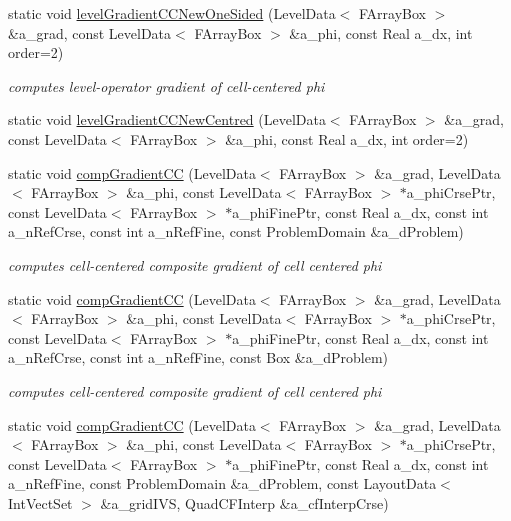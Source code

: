\begin{DoxyCompactItemize}
static void \hyperlink{class_gradient_a00daa2aa0e66c5f70545cbd9cdf633a2}{level\-Gradient\-C\-C\-New\-One\-Sided} (Level\-Data$<$ F\-Array\-Box $>$ \&a\-\_\-grad, const Level\-Data$<$ F\-Array\-Box $>$ \&a\-\_\-phi, const Real a\-\_\-dx, int order=2)
\begin{DoxyCompactList}\small\item\em computes level-\/operator gradient of cell-\/centered phi \end{DoxyCompactList}\item 
static void \hyperlink{class_gradient_a306b5f347d51c38d5cf8a7f446ea0b86}{level\-Gradient\-C\-C\-New\-Centred} (Level\-Data$<$ F\-Array\-Box $>$ \&a\-\_\-grad, const Level\-Data$<$ F\-Array\-Box $>$ \&a\-\_\-phi, const Real a\-\_\-dx, int order=2)
\item 
static void \hyperlink{class_gradient_a6c741fa4909be6c7d55ddc70a128ca93}{comp\-Gradient\-C\-C} (Level\-Data$<$ F\-Array\-Box $>$ \&a\-\_\-grad, Level\-Data$<$ F\-Array\-Box $>$ \&a\-\_\-phi, const Level\-Data$<$ F\-Array\-Box $>$ $\ast$a\-\_\-phi\-Crse\-Ptr, const Level\-Data$<$ F\-Array\-Box $>$ $\ast$a\-\_\-phi\-Fine\-Ptr, const Real a\-\_\-dx, const int a\-\_\-n\-Ref\-Crse, const int a\-\_\-n\-Ref\-Fine, const Problem\-Domain \&a\-\_\-d\-Problem)
\begin{DoxyCompactList}\small\item\em computes cell-\/centered composite gradient of cell centered phi \end{DoxyCompactList}\item 
static void \hyperlink{class_gradient_a0a941dcb9ad58ed819f41d4fe1080106}{comp\-Gradient\-C\-C} (Level\-Data$<$ F\-Array\-Box $>$ \&a\-\_\-grad, Level\-Data$<$ F\-Array\-Box $>$ \&a\-\_\-phi, const Level\-Data$<$ F\-Array\-Box $>$ $\ast$a\-\_\-phi\-Crse\-Ptr, const Level\-Data$<$ F\-Array\-Box $>$ $\ast$a\-\_\-phi\-Fine\-Ptr, const Real a\-\_\-dx, const int a\-\_\-n\-Ref\-Crse, const int a\-\_\-n\-Ref\-Fine, const Box \&a\-\_\-d\-Problem)
\begin{DoxyCompactList}\small\item\em computes cell-\/centered composite gradient of cell centered phi \end{DoxyCompactList}\item 
static void \hyperlink{class_gradient_a029f7d1cb39888c2e12b9fb016b58928}{comp\-Gradient\-C\-C} (Level\-Data$<$ F\-Array\-Box $>$ \&a\-\_\-grad, Level\-Data$<$ F\-Array\-Box $>$ \&a\-\_\-phi, const Level\-Data$<$ F\-Array\-Box $>$ $\ast$a\-\_\-phi\-Crse\-Ptr, const Level\-Data$<$ F\-Array\-Box $>$ $\ast$a\-\_\-phi\-Fine\-Ptr, const Real a\-\_\-dx, const int a\-\_\-n\-Ref\-Fine, const Problem\-Domain \&a\-\_\-d\-Problem, const Layout\-Data$<$ Int\-Vect\-Set $>$ \&a\-\_\-grid\-I\-V\-S, Quad\-C\-F\-Interp \&a\-\_\-cf\-Interp\-Crse)

\end{DoxyCompactItemize}
